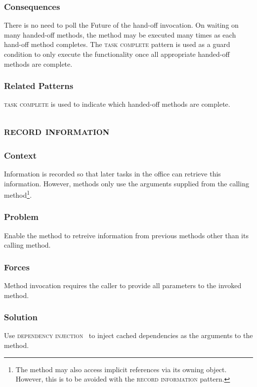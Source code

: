 \documentclass[prodmode]{style/acmlarge}
\begin{document}
\subsubsection*{Consequences} There is no need to poll the Future of the
hand-off invocation.  On waiting on many handed-off methods, the method may be
executed many times as each hand-off method completes.  The \textsc{task
complete} pattern is used as a guard condition to only execute the functionality
once all appropriate handed-off methods are complete.

\subsubsection*{Related Patterns} \textsc{task complete} is used to indicate
which handed-off methods are complete.



\subsection{\textsc{\textbf{record information}}}

\subsubsection*{Context} Information is recorded so that later tasks in the
office can retrieve this information.  However, methods only use the arguments
supplied from the calling method\footnote{The method may also access implicit
references via its owning object.  However, this is to be avoided with the
\textsc{record information} pattern.}.

\subsubsection*{Problem} Enable the method to retreive information from previous
methods other than its calling method.

\subsubsection*{Forces} Method invocation requires the caller to provide all
parameters to the invoked method.

\subsubsection*{Solution} Use \textsc{dependency injection}~\cite{ioc} to inject
cached dependencies as the arguments to the method.
\end{document}
